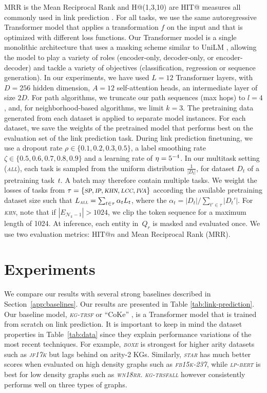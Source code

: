 \documentclass{article}
\newcommand{\kgtrsf}{\textsl{\textsc{kg-trsf}}\xspace}
\newcommand{\starbert}{\textsl{\textsc{star}}\xspace}
\newcommand{\lpbert}{\textsl{\textsc{lp-bert}}\xspace}
\newcommand{\boxe}{\textsl{\textsc{boxe}}\xspace}
\newcommand{\wnrr}{\textsl{\textsc{wn18rr}}\xspace}
\newcommand{\fb}{\textsl{\textsc{fb15k-237}}\xspace}
\newcommand{\jf}{\textsl{\textsc{jf17k}}\xspace}
\newcommand{\spa}{\textsl{\textsc{sp}}\xspace}
\newcommand{\ipa}{\textsl{\textsc{ip}}\xspace}
\newcommand{\hn}{\textsl{\textsc{khn}}\xspace}
\newcommand{\lcc}{\textsl{\textsc{lcc}}\xspace}
\newcommand{\iva}{\textsl{\textsc{iva}}\xspace}
\newcommand{\all}{\textsl{\textsc{all}}\xspace}
\begin{document}
MRR is the Mean Reciprocal Rank and H@(1,3,10) are HIT@ measures all commonly used in link prediction \cite{Mohamed2019LossFI}.
For all tasks, we use the same autoregressive Transformer model that applies a transformation $f$ on the input and that is optimized with different loss functions.
Our Transformer model is a single monolithic architecture that uses a masking scheme similar to UniLM \cite{unilm2019}, allowing the model to play a variety of roles (encoder-only, decoder-only, or encoder-decoder) and tackle a variety of objectives (classification, regression or sequence generation). 
In our experiments, we have used $L=12$ Transformer layers, with $D=256$ hidden dimension, $A=12$ self-attention heads, an intermediate layer of size $2D$.
For path algorithms, we truncate our path sequences (max hops) to $l=4$, and, for neighborhood-based algorithms, we limit $k=3$.
The pretraining data generated from each dataset is applied to separate model instances. 
For each dataset, we save the weights of the pretrained model that performs best on the evaluation set of the link prediction task. 
During link prediction finetuning, we use a dropout rate $\rho \in \{0.1, 0.2, 0.3, 0.5\}$, a label smoothing rate $\zeta \in \{0.5, 0.6, 0.7, 0.8, 0.9\}$ and a learning rate of $\eta=5\time10^{-4}$.
In our multitask setting (\all), each task is sampled from the uniform distribution $\frac{1}{|D_t|}$, for dataset $D_t$ of a pretraining task~$t$. A batch may therefore contain multiple tasks. We weight the losses of tasks from $\tau = \{\spa, \ipa, \hn, \lcc, \iva \}$ according the available pretraining dataset size such that $L_{\all}= \sum_{t\in \tau}\alpha_{t}L_{t}$, where the $\alpha_{t} = |D_t|/\sum_{t'\in \tau}|D_t'|$.
For \hn, note that if $|E_{\mathcal{N}_k-1}|> 1024$, we clip the token sequence for a maximum length of 1024.
At inference, each entity in~$Q_r$ is masked and evaluated once. 
We use two evaluation metrics: HIT@$n$ and Mean Reciprocal Rank (MRR).


\section{Experiments}
\label{sec:exp}

We compare our results with several strong baselines described in Section~\ref{app:baselines}. 
Our results are presented in Table \ref{tab:link-prediction}. 
Our baseline model, \kgtrsf or ``CoKe'' \cite{coke}, is a Transformer model that is trained from scratch on link prediction. 
It is important to keep in mind the dataset properties in Table~\ref{tab:data} since they explain performance variations of the most recent techniques.
For example, \boxe is strongest for higher arity datasets such as \jf but lags behind on arity-2 KGs.
Similarly, \starbert has much better scores when evaluated on high density graphs such as \fb, 
while \lpbert is best for low density graphs such as \wnrr.
\kgtrsf \all however consistently performs well on three types of graphs.
\end{document}
